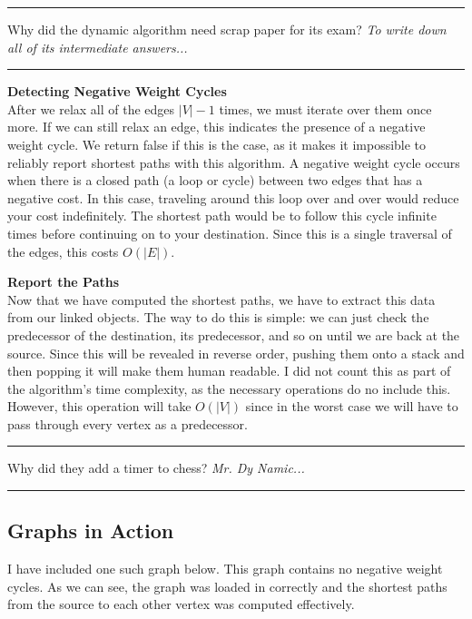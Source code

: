 \documentclass[letterpaper, 10pt]{article}
\begin{document}
\hrule
\vspace{.25cm}
Why did the dynamic algorithm need scrap paper for its exam? \textit{To write down all of its intermediate answers...}
\vspace{.25cm}
\hrule 
\noindent\newline\newline
\textbf{Detecting Negative Weight Cycles} \\
\indent After we relax all of the edges $|V| - 1$ times, we must iterate over them once more. If we can still relax an edge, this indicates the presence of a negative weight cycle. We return false if this is the case, as it makes it impossible to reliably report shortest paths with this algorithm. A negative weight cycle occurs when there is a closed path (a loop or cycle) between two edges that has a negative cost. In this case, traveling around this loop over and over would reduce your cost indefinitely. The shortest path would be to follow this cycle infinite times before continuing on to your destination. Since this is a single traversal of the edges, this costs $O(|E|)$.



\noindent\newline
\textbf{Report the Paths} \\
\indent Now that we have computed the shortest paths, we have to extract this data from our linked objects. The way to do this is simple: we can just check the predecessor of the destination, its predecessor, and so on until we are back at the source. Since this will be revealed in reverse order, pushing them onto a stack and then popping it will make them human readable. I did not count this as part of the algorithm's time complexity, as the necessary operations do no include this. However, this operation will take $O(|V|)$ since in the worst case we will have to pass through every vertex as a predecessor. 


\hrule
\vspace{.25cm}
Why did they add a timer to chess? \textit{Mr. Dy Namic...}\\
\hrule
\vspace{.5cm}

\subsection{Graphs in Action}
I have included one such graph below. This graph contains no negative weight cycles. As we can see, the graph was loaded in correctly and the shortest paths from the source to each other vertex was computed effectively. 

\end{document}
